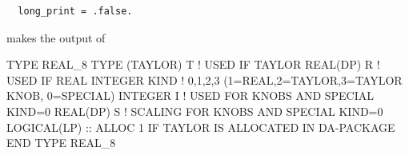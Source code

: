 \documentclass[english,12pt,article]{article} %
\begin{document}
\begin{verbatim}
  long_print = .false.
\end{verbatim}
makes the output of 



  TYPE REAL_8
     TYPE (TAYLOR) T      !  USED IF TAYLOR
     REAL(DP) R           !    USED IF REAL
     INTEGER KIND  !  0,1,2,3 (1=REAL,2=TAYLOR,3=TAYLOR KNOB, 0=SPECIAL)
     INTEGER I   !   USED FOR KNOBS AND SPECIAL KIND=0
     REAL(DP) S   !   SCALING FOR KNOBS AND SPECIAL KIND=0
     LOGICAL(LP) :: ALLOC  1 IF TAYLOR IS ALLOCATED IN DA-PACKAGE
  END TYPE REAL_8




\end{document}
